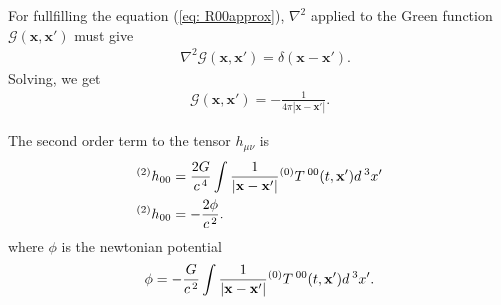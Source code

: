 For fullfilling the equation (\ref{eq: R00approx}), $\nabla^2$ applied to the Green function $\mathcal{G}(\mathbf{x},\mathbf{x'})$ must give
\begin{align}
&\nabla^{2}{}\mathcal{G}(\mathbf{x},\mathbf{x'}) = \delta(\mathbf{x}-\mathbf{x'}).
\end{align}
Solving, we get
\begin{align}
 \mathcal{G}(\mathbf{x},\mathbf{x'}) = -\frac{1}{4\pi |\mathbf{x}-\mathbf{x'}|}.
 \end{align}
 
The second order term to the tensor $h_{\mu\nu}$ is
\begin{align}
&^{(2)}h_{00} = \frac{2G}{c^{\hspace{0.05cm}4}}\int \frac{1}{|\mathbf{x}-\mathbf{x'}|}{}^{(0)}T{}^{\hspace{0.07cm}00}(t,\mathbf{x'})d^{\hspace{0.07cm}3}x'\\
\label{eq: hoonewton}
&^{(2)}h_{00} = -\frac{2\phi}{c^{\hspace{0.05cm}2}}.
\end{align}
where $\phi$ is the newtonian potential
\begin{align}
\phi = -\frac{G}{c^{\hspace{0.05cm}2}}\int \frac{1}{|\mathbf{x}-\mathbf{x'}|}{}^{(0)}T{}^{\hspace{0.07cm}00}(t,\mathbf{x'})d^{\hspace{0.07cm}3}x'.
\end{align}



